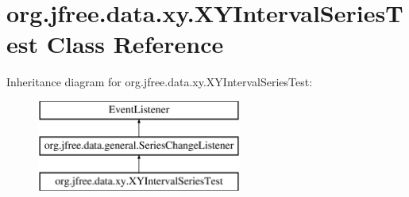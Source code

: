 \hypertarget{classorg_1_1jfree_1_1data_1_1xy_1_1_x_y_interval_series_test}{}\section{org.\+jfree.\+data.\+xy.\+X\+Y\+Interval\+Series\+Test Class Reference}
\label{classorg_1_1jfree_1_1data_1_1xy_1_1_x_y_interval_series_test}
Inheritance diagram for org.\+jfree.\+data.\+xy.\+X\+Y\+Interval\+Series\+Test\+:\begin{figure}[H]
\begin{center}
\leavevmode
\includegraphics[height=3.000000cm]{classorg_1_1jfree_1_1data_1_1xy_1_1_x_y_interval_series_test}
\end{center}
\end{figure}
